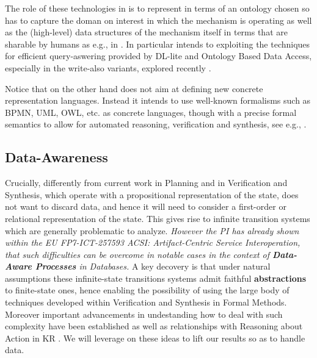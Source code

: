 The role of these technologies in \project is to represent in terms of an ontology chosen so has to capture the doman on interest in which the mechanism is operating as well as the (high-level) data structures of the mechanism itself in terms that are sharable by humans as e.g., in \cite{TenorthB17}. In particular \project intends to exploiting the techniques for efficient query-aswering provided by DL-lite and Ontology Based Data Access, especially in the write-also variants, explored recently \cite{DORS16,DLOST17}.


Notice that on the other hand \project does not aim at defining new
concrete representation languages. Instead it intends to use
well-known formalisms such as BPMN, UML, OWL, etc. as concrete
languages, though with a precise formal semantics to allow for
automated reasoning, verification and synthesis, see e.g.,
\cite{BerardiCG05,DeGiacomoOET17}.




\subsection{Data-Awareness}


Crucially, differently from current work in Planning and in
Verification and Synthesis, which operate with a propositional
representation of the state, \project does not want to discard data, and hence
it will need to consider a first-order or relational representation of
the state. This gives rise to infinite transition systems which are generally problematic to analyze.
\emph{However the PI
has already shown within the EU FP7-ICT-257593 ACSI: Artifact-Centric
Service Interoperation, that such difficulties can be overcome in
notable cases
\cite{BerardiCGHM05,CalvaneseGHS09,HaririCGDM13,CalvaneseGMP13} in the context of \textbf{Data-Aware Processes} in Databases.} A key
decovery is that under natural assumptions these infinite-state
transitions systems admit faithful \textbf{abstractions} to
finite-state ones, hence enabling the possibility of using the large
body of techniques developed within  Verification and Synthesis in
Formal Methods. Moreover important advancements in undestanding how to
deal with such complexity have been established as well as
relationships with Reasoning about Action in KR
\cite{HaririCMGMF13,BelardinelliLP14,CalvaneseGS15,CDMP17,BanihashemiGL17}.
We will leverage on these ideas to lift our results so
as to handle data.

